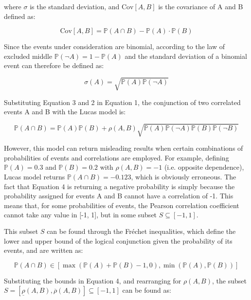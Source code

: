\documentclass[runningheads]{llncs}
\begin{document}
\noindent where $\sigma$ is the standard deviation, and $\text{Cov}[A,B]$ is the covariance of A and B defined as:

\begin{equation}
\text{Cov}[A,B]= \mathbb{P}(A \cap B) - \mathbb{P}(A) \cdot \mathbb{P}(B)
\end{equation}

 Since the events under consideration are binomial, according to the law of excluded middle $\mathbb{P}(\neg A) = 1 - \mathbb{P}(A)$ and the standard deviation of a binomial event can therefore be defined as:

\begin{equation}
    \sigma(A) = \sqrt{\mathbb{P}(A)\mathbb{P}(\neg A)}
\label{std}
\end{equation}

Substituting Equation 3 and 2 in Equation 1, the conjunction of two correlated events A and B with the Lucas model is:

\begin{equation}
    \mathbb{P}(A \cap B) = \mathbb{P}(A)\mathbb{P}(B) + \rho(A,B)\sqrt{\mathbb{P}(A)\mathbb{P}(\neg A)\mathbb{P}(B)\mathbb{P}(\neg B)}
\end{equation}

However, this model can return misleading results when certain combinations of probabilities of events and correlations are employed.
For example, defining $\mathbb{P}(A) = 0.3$ and $\mathbb{P}(B)=0.2$ with $\rho(A,B) = -1$ (i.e. opposite dependence), Lucas model returns $\mathbb{P}(A \cap B) = -0.123$, which is obviously erroneous.
The fact that Equation 4 is returning a negative probability is simply because the probability assigned for events A and B cannot have a correlation of -1.
This means that, for some probabilities of events, the Pearson correlation coefficient cannot take any value in [-1, 1], but in some subset $S \subseteq [-1,1]$.

This subset $S$ can be found through the Fréchet inequalities, which define the lower and upper bound of the logical conjunction given the probability of its events, and are written as:

\begin{equation}
    \mathbb{P}(A \cap B) \in [\max(\mathbb{P}(A)+\mathbb{P}(B)-1, 0), \min(\mathbb{P}(A),\mathbb{P}(B))]
\end{equation}

Substituting the bounds in Equation 4, and rearranging for $\rho(A,B)$, the subset $S = [\underline\rho(A,B),\overline\rho(A,B)] \subseteq [-1,1]$ can be found as:
\end{document}
